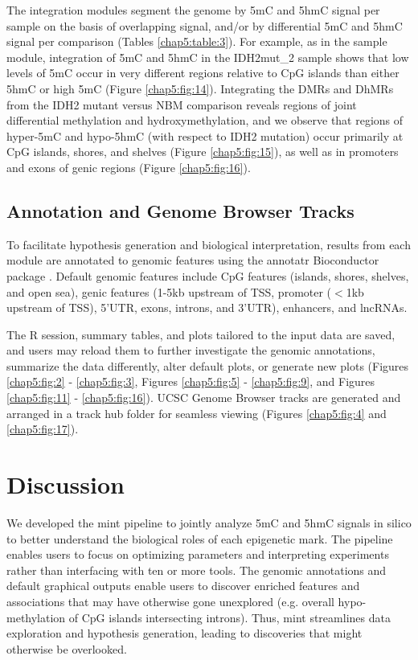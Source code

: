 The integration modules segment the genome by 5mC and 5hmC signal per sample on the basis of overlapping signal, and/or by differential 5mC and 5hmC signal per comparison (Tables \ref{chap5:table:3}). For example, as in the sample module, integration of 5mC and 5hmC in the IDH2mut\_2 sample shows that low levels of 5mC occur in very different regions relative to CpG islands than either 5hmC or high 5mC (Figure \ref{chap5:fig:14}). Integrating the DMRs and DhMRs from the IDH2 mutant versus NBM comparison reveals regions of joint differential methylation and hydroxymethylation, and we observe that regions of hyper-5mC and hypo-5hmC (with respect to IDH2 mutation) occur primarily at CpG islands, shores, and shelves (Figure \ref{chap5:fig:15}), as well as in promoters and exons of genic regions (Figure \ref{chap5:fig:16}).

\subsection{Annotation and Genome Browser Tracks}
\label{mint_results_annotation}

To facilitate hypothesis generation and biological interpretation, results from each module are annotated to genomic features using the annotatr Bioconductor package \cite{Cavalcante:2017gc}. Default genomic features include CpG features (islands, shores, shelves, and open sea), genic features (1-5kb upstream of TSS, promoter ($<$1kb upstream of TSS), 5'UTR, exons, introns, and 3'UTR), enhancers, and lncRNAs.

The R session, summary tables, and plots tailored to the input data are saved, and users may reload them to further investigate the genomic annotations, summarize the data differently, alter default plots, or generate new plots (Figures \ref{chap5:fig:2} - \ref{chap5:fig:3}, Figures \ref{chap5:fig:5} - \ref{chap5:fig:9}, and Figures \ref{chap5:fig:11} - \ref{chap5:fig:16}). UCSC Genome Browser tracks are generated and arranged in a track hub folder for seamless viewing (Figures \ref{chap5:fig:4} and \ref{chap5:fig:17}).

\section{Discussion}
\label{mint_discussion}

We developed the mint pipeline to jointly analyze 5mC and 5hmC signals in silico to better understand the biological roles of each epigenetic mark. The pipeline enables users to focus on optimizing parameters and interpreting experiments rather than interfacing with ten or more tools. The genomic annotations and default graphical outputs enable users to discover enriched features and associations that may have otherwise gone unexplored (e.g. overall hypo-methylation of CpG islands intersecting introns). Thus, mint streamlines data exploration and hypothesis generation, leading to discoveries that might otherwise be overlooked.

